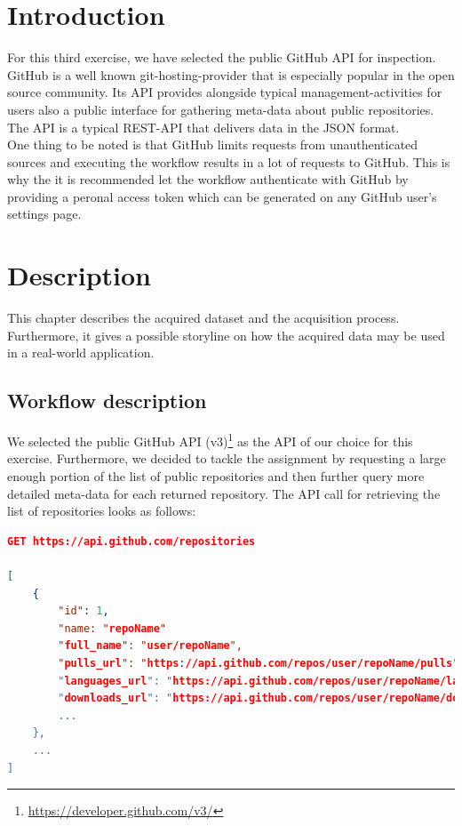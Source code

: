 \section{Introduction}\label{sec:introduction}

For this third exercise, we have selected the public GitHub API for inspection.
GitHub is a well known git-hosting-provider that is especially popular in the
open source community. Its API provides alongside typical management-activities
for users also a public interface for gathering meta-data about public
repositories. The API is a typical REST-API that delivers data in the JSON
format.\\

One thing to be noted is that GitHub limits requests from unauthenticated
sources and executing the workflow results in a lot of requests to GitHub. This
is why the it is recommended let the workflow authenticate with GitHub by
providing a peronal access token which can be generated on any GitHub user's
settings page.

\section{Description}\label{sec:description}

This chapter describes the acquired dataset and the acquisition process.
Furthermore, it gives a possible storyline on how the acquired data may be used
in a real-world application.

\subsection{Workflow description}\label{sec:workflow-description}

We selected the public GitHub API
(v3)\footnote{\url{https://developer.github.com/v3/}} as the API of our choice
for this exercise. Furthermore, we decided to tackle the assignment by
requesting a large enough portion of the list of public repositories and then
further query more detailed meta-data for each returned repository. The API call
for retrieving the list of repositories looks as follows:

\begin{lstlisting}[language=json]
GET https://api.github.com/repositories

[
    {
        "id": 1,
        "name: "repoName"
        "full_name": "user/repoName",
        "pulls_url": "https://api.github.com/repos/user/repoName/pulls"
        "languages_url": "https://api.github.com/repos/user/repoName/languages"
        "downloads_url": "https://api.github.com/repos/user/repoName/downloads",
        ...
    },
    ...
]
\end{lstlisting}

